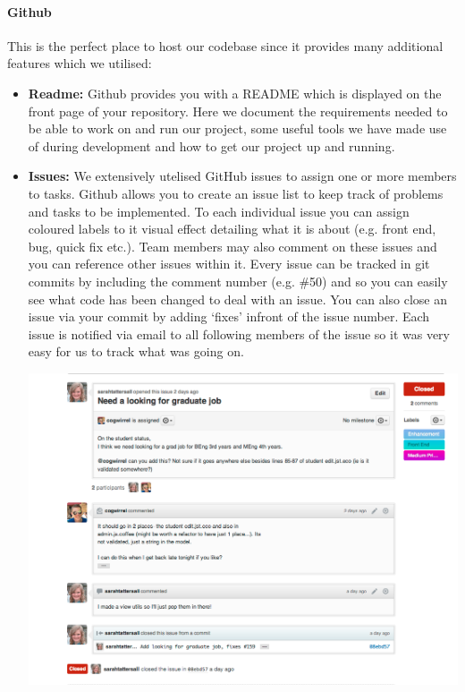     \paragraph{Github} This is the perfect place to host our codebase since it provides many additional features which we utilised:
    \begin{itemize}
        \item \textbf{Readme:} Github provides you with a README which is displayed on the front page of your repository. Here we document the requirements needed to be able to work on and run our project, some useful tools we have made use of during development and how to get our project up and running.
        \item \textbf{Issues:} We extensively utelised GitHub issues to assign one or more members to tasks. Github allows you to create an issue list to keep track of problems and tasks to be implemented. To each individual issue you can assign coloured labels to it visual effect detailing what it is about (e.g. front end, bug, quick fix etc.). Team members may also comment on these issues and you can reference other issues within it. Every issue can be tracked in git commits by including the comment number (e.g. \#50) and so you can easily see what code has been changed to deal with an issue. You can also close an issue via your commit by adding `fixes' infront of the issue number. Each issue is notified via email to all following members of the issue so it was very easy for us to track what was going on. 

        \begin{center}
        \includegraphics[scale=0.3]{images/project_management/team_management/graduate_issue}


\end{center}
\end{itemize}
